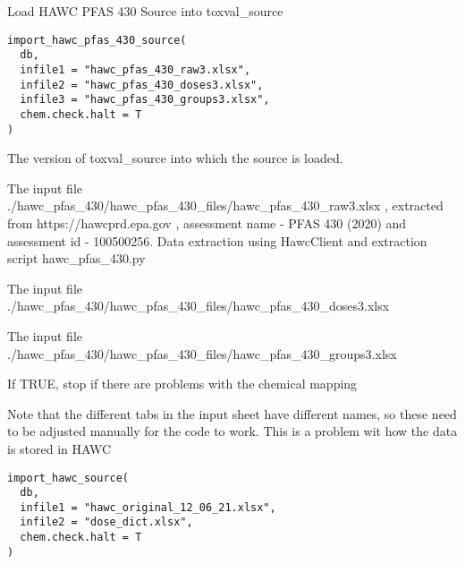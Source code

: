 \documentclass[letterpaper]{book}
\begin{document}
%
\begin{Description}\relax
Load HAWC PFAS 430 Source into toxval\_source
\end{Description}
%
\begin{Usage}
\begin{verbatim}
import_hawc_pfas_430_source(
  db,
  infile1 = "hawc_pfas_430_raw3.xlsx",
  infile2 = "hawc_pfas_430_doses3.xlsx",
  infile3 = "hawc_pfas_430_groups3.xlsx",
  chem.check.halt = T
)
\end{verbatim}
\end{Usage}
%
\begin{Arguments}
\begin{ldescription}
\item[\code{db}] The version of toxval\_source into which the source is loaded.

\item[\code{infile1}] The input file ./hawc\_pfas\_430/hawc\_pfas\_430\_files/hawc\_pfas\_430\_raw3.xlsx , extracted
from https://hawcprd.epa.gov , assessment name - PFAS 430 (2020) and assessment id - 100500256.
Data extraction using HawcClient and extraction script hawc\_pfas\_430.py

\item[\code{infile2}] The input file ./hawc\_pfas\_430/hawc\_pfas\_430\_files/hawc\_pfas\_430\_doses3.xlsx

\item[\code{infile3}] The input file ./hawc\_pfas\_430/hawc\_pfas\_430\_files/hawc\_pfas\_430\_groups3.xlsx

\item[\code{chem.check.halt}] If TRUE, stop if there are problems with the chemical mapping
\end{ldescription}
\end{Arguments}
%
\begin{Description}\relax
Note that the different tabs in the input sheet have different names, so these need
to be adjusted manually for the code to work. This is a problem wit how the data
is stored in HAWC
\end{Description}
%
\begin{Usage}
\begin{verbatim}
import_hawc_source(
  db,
  infile1 = "hawc_original_12_06_21.xlsx",
  infile2 = "dose_dict.xlsx",
  chem.check.halt = T
)
\end{verbatim}
\end{Usage}
\end{document}

